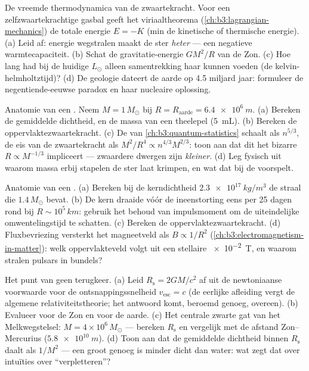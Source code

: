 \begin{exercise}[$\star\star$]\label{exo:b3:astrophysics:5}
De vreemde thermodynamica van de zwaartekracht. Voor een zelfzwaartekrachtige gasbal
geeft het viriaaltheorema (\cref{ch:b3:lagrangian-mechanics})
de totale energie $E = -K$ (min de kinetische of thermische energie).
(a) Leid af: energie wegstralen maakt de ster \emph{heter}
--- een negatieve warmtecapaciteit. (b) Schat de gravitatie-energie
$GM^2/R$ van de Zon. (c) Hoe lang had bij de huidige $L_\odot$ alleen
samentrekking haar kunnen voeden (de kelvin-helmholtztijd)? (d) De
geologie dateert de aarde op 4.5 miljard jaar: formuleer de
negentiende-eeuwse paradox en haar nucleaire oplossing.
\end{exercise}

\begin{exercise}[$\star\star$]\label{exo:b3:astrophysics:6}
Anatomie van een . Neem $M = 1\,M_\odot$ bij
$R = R_{\text{aarde}} = \qty{6.4e6}{m}$. (a) Bereken de gemiddelde
dichtheid, en de massa van een theelepel (\qty{5}{mL}). (b) Bereken de
oppervlaktezwaartekracht. (c) De  van
\cref{ch:b3:quantum-statistics} schaalt als $n^{5/3}$, de eis van de zwaartekracht als
$M^2/R^4 \propto n^{4/3}M^{2/3}$: toon aan dat dit het
bizarre $R \propto M^{-1/3}$ impliceert --- zwaardere dwergen zijn
\emph{kleiner}. (d) Leg fysisch uit waarom massa erbij stapelen
de ster laat krimpen, en wat dat bij de 
voorspelt.
\end{exercise}

\begin{exercise}[$\star\star$]\label{exo:b3:astrophysics:7}
Anatomie van een . (a) Bereken bij de kerndichtheid
$\qty{2.3e17}{kg/m^3}$ de straal die
$1.4\,M_\odot$ bevat. (b) De kern draaide vóór de ineenstorting eens per 25 dagen rond
bij $R \sim 10^5\,\unit{km}$: gebruik het behoud van impulsmoment
om de uiteindelijke omwentelingstijd te schatten. (c) Bereken de
oppervlaktezwaartekracht. (d) Fluxbevriezing versterkt het magneetveld als
$B \propto 1/R^2$ (\cref{ch:b3:electromagnetism-in-matter}):
welk oppervlakteveld volgt uit een stellaire \qty{e-2}{T}, en
waarom stralen pulsars in bundels?
\end{exercise}

\begin{exercise}[$\star\star$]\label{exo:b3:astrophysics:8}
Het punt van geen terugkeer. (a) Leid $R_{\text{s}} = 2GM/c^2$ af uit
de newtoniaanse voorwaarde voor de ontsnappingssnelheid $v_{\text{esc}} = c$ (de
eerlijke afleiding vergt de algemene relativiteitstheorie; het antwoord
komt, beroemd genoeg, overeen). (b) Evalueer voor de Zon en voor de aarde.
(c) Het centrale zwarte gat van het Melkwegstelsel: $M = 4\times10^6\,M_\odot$
--- bereken $R_{\text{s}}$ en vergelijk met de afstand Zon--Mercurius
($\qty{5.8e10}{m}$). (d) Toon aan dat de gemiddelde dichtheid binnen
$R_{\text{s}}$ daalt als $1/M^2$ --- een groot genoeg  is
minder dicht dan water: wat zegt dat over intuïties over
``verpletteren''?
\end{exercise}

